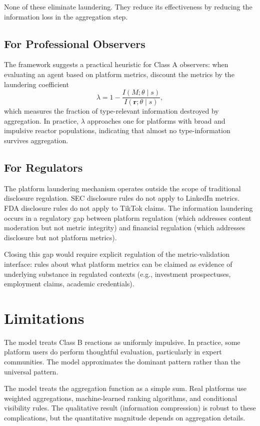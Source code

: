 \documentclass[11pt]{article}
\begin{document}
None of these eliminate laundering. They reduce its effectiveness by reducing the information loss in the aggregation step.

\subsection{For Professional Observers}

The framework suggests a practical heuristic for Class A observers: when evaluating an agent based on platform metrics, discount the metrics by the laundering coefficient
\[
\lambda = 1 - \frac{I(M; \theta \mid s)}{I(\mathbf{r}; \theta \mid s)},
\]
which measures the fraction of type-relevant information destroyed by aggregation. In practice, $\lambda$ approaches one for platforms with broad and impulsive reactor populations, indicating that almost no type-information survives aggregation.

\subsection{For Regulators}

The platform laundering mechanism operates outside the scope of traditional disclosure regulation. SEC disclosure rules do not apply to LinkedIn metrics. FDA disclosure rules do not apply to TikTok claims. The information laundering occurs in a regulatory gap between platform regulation (which addresses content moderation but not metric integrity) and financial regulation (which addresses disclosure but not platform metrics).

Closing this gap would require explicit regulation of the metric-validation interface: rules about what platform metrics can be claimed as evidence of underlying substance in regulated contexts (e.g., investment prospectuses, employment claims, academic credentials).

\section{Limitations}

The model treats Class B reactions as uniformly impulsive. In practice, some platform users do perform thoughtful evaluation, particularly in expert communities. The model approximates the dominant pattern rather than the universal pattern.

The model treats the aggregation function as a simple sum. Real platforms use weighted aggregations, machine-learned ranking algorithms, and conditional visibility rules. The qualitative result (information compression) is robust to these complications, but the quantitative magnitude depends on aggregation details.
\end{document}
